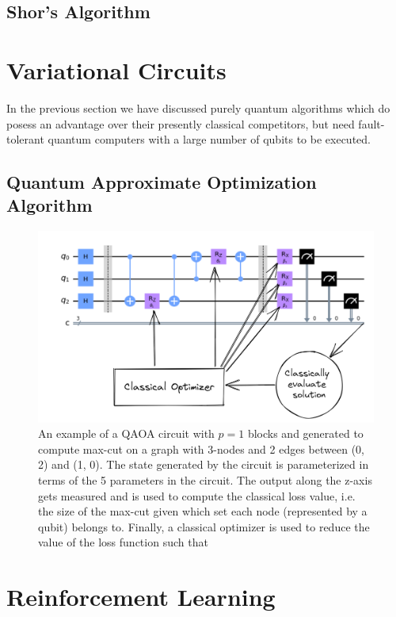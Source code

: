 \subsection{Shor's Algorithm}



\section{Variational Circuits}
\label{sec:variational-circuits}

In the previous section we have discussed purely quantum algorithms which do posess an advantage over their presently classical competitors, but need fault-tolerant quantum computers with a large number of qubits to be executed.

\subsection{Quantum Approximate Optimization Algorithm}
\label{sec:variational-circuits-qaoa}

\begin{figure}[ht]
    \centering
    \includegraphics[width=0.7\linewidth]{figures/intro/qaoa-optimization.png}
    \caption[Variational Circuit for QAOA]{An example of a QAOA circuit with $p = 1$ blocks and generated to compute max-cut on a graph with 3-nodes and 2 edges between (0, 2) and (1, 0). The state generated by the circuit is parameterized in terms of the 5 parameters in the circuit. The output along the z-axis gets measured and is used to compute the classical loss value, i.e. the size of the max-cut given which set each node (represented by a qubit) belongs to. Finally, a classical optimizer is used to reduce the value of the loss function such that }
\end{figure}



\section{Reinforcement Learning}

